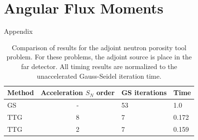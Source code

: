 \documentclass[preprint,12pt]{elsarticle}
\begin{document}

\newpage
\appendix

\section{Angular Flux Moments}
\label{sec:angular-flux-moments}

Appendix


\newpage

\singlespacing





\clearpage

\begin{table}[p]
  \caption{
    Comparison of results for the adjoint neutron porosity tool
    problem. For these problems, the adjoint source is place in the
    far detector.  All timing results are normalized to the
    unaccelerated Gauss-Seidel iteration time.
  }
  \label{tab:adjoint-porosity-tool}
  \begin{center}
    \begin{tabular}{lcll}\hline\hline
      Method & Acceleration $S_N$ order & GS iterations & Time \\\hline
      GS & - & 53 & 1.0   \\
      TTG & 8 & 7 & 0.172 \\
      TTG & 2 & 7 & 0.159 \\
      \hline\hline
    \end{tabular}
  \end{center}
\end{table}


\clearpage
\end{document}
